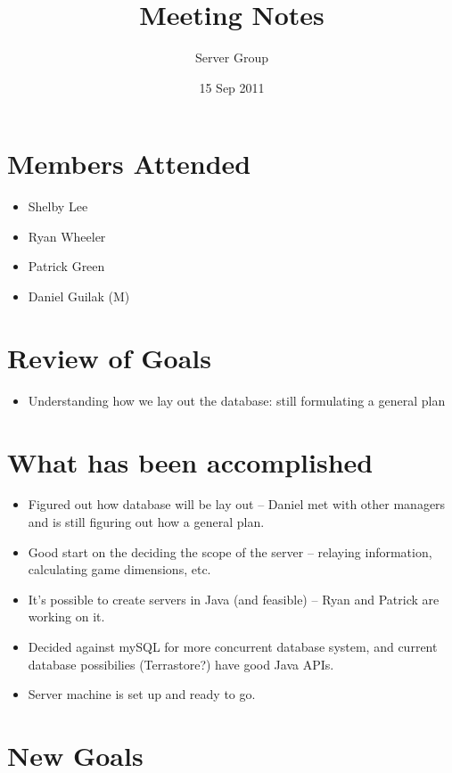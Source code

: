 \documentclass[11pt]{article} %
\title{Meeting Notes}
\author{Server Group}
\date{15 Sep 2011} %
\begin{document}
\maketitle

\section{Members Attended}

\begin{itemize}
	\item Shelby Lee
	\item Ryan Wheeler
	\item Patrick Green
	\item Daniel Guilak (M)
\end{itemize}

\section{Review of Goals}

\begin{itemize}
	\item Understanding how we lay out the database: still formulating a general plan
\end{itemize}

\section{What has been accomplished}

\begin{itemize}
	\item Figured out how database will be lay out – Daniel met with other managers and is still figuring out how a general plan.
       \item Good start on the deciding the scope of the server -- relaying information, calculating game dimensions, etc.
       \item It's possible to create servers in Java (and feasible) -- Ryan and Patrick are working on it.
       \item Decided against mySQL for more concurrent database system, and current database possibilies (Terrastore?) have good Java APIs.
       \item Server machine is set up and ready to go.
\end{itemize}

\section{New Goals}
\end{document}
